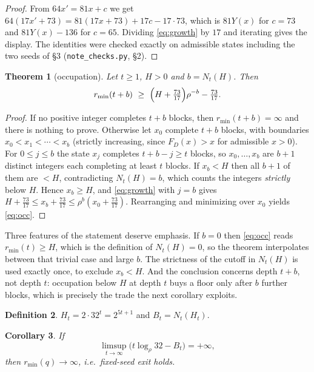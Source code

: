 \documentclass[11pt,a4paper]{article}
\theoremstyle{plain}
\newtheorem{theorem}{Theorem}[section]
\newtheorem{corollary}[theorem]{Corollary}
\theoremstyle{definition}
\newtheorem{definition}[theorem]{Definition}
\theoremstyle{remark}
\begin{document}
\begin{proof}
From $64x'=81x+c$ we get $64(17x'+73)=81(17x+73)+17c-17\cdot 73$, which is
$81Y(x)$ for $c=73$ and $81Y(x)-136$ for $c=65$. Dividing \eqref{eq:growth} by
$17$ and iterating gives the display. The identities were checked exactly on
admissible states including the two seeds of \S3 (\texttt{note\_checks.py},
\S2).
\end{proof}

\begin{theorem}[occupation]\label{thm:occ}
Let $t\ge 1$, $H>0$ and $b=N_t(H)$. Then
\begin{equation}\label{eq:occ}
r_{\min}(t+b)\ \ge\ \Bigl(H+\tfrac{73}{17}\Bigr)\rho^{-b}-\tfrac{73}{17}.
\end{equation}
\end{theorem}

\begin{proof}
If no positive integer completes $t+b$ blocks, then $r_{\min}(t+b)=\infty$ and
there is nothing to prove. Otherwise let $x_0$ complete $t+b$ blocks, with
boundaries $x_0<x_1<\cdots<x_b$ (strictly increasing, since $F_D(x)>x$ for
admissible $x>0$). For $0\le j\le b$ the state $x_j$ completes $t+b-j\ge t$
blocks, so $x_0,\dots,x_b$ are $b+1$ distinct integers each completing at least
$t$ blocks. If $x_b<H$ then all $b+1$ of them are $<H$, contradicting
$N_t(H)=b$, which counts the integers \emph{strictly} below $H$. Hence
$x_b\ge H$, and \eqref{eq:growth} with $j=b$ gives
$H+\tfrac{73}{17}\le x_b+\tfrac{73}{17}\le\rho^{b}(x_0+\tfrac{73}{17})$.
Rearranging and minimizing over $x_0$ yields \eqref{eq:occ}.
\end{proof}

Three features of the statement deserve emphasis. If $b=0$ then
\eqref{eq:occ} reads $r_{\min}(t)\ge H$, which is the definition of $N_t(H)=0$,
so the theorem interpolates between that trivial case and large $b$. The
strictness of the cutoff in $N_t(H)$ is used exactly once, to exclude
$x_b<H$. And the conclusion concerns depth $t+b$, not depth $t$: occupation
below $H$ at depth $t$ buys a floor only after $b$ further blocks, which is
precisely the trade the next corollary exploits.

\begin{definition}
$H_t=2\cdot 32^t=2^{5t+1}$ and $B_t=N_t(H_t)$.
\end{definition}

\begin{corollary}\label{cor:suff}
If
\[
\limsup_{t\to\infty}\bigl(t\log_\rho 32-B_t\bigr)=+\infty,
\]
then $r_{\min}(q)\to\infty$, i.e.\ fixed-seed exit holds.
\end{corollary}
\end{document}
